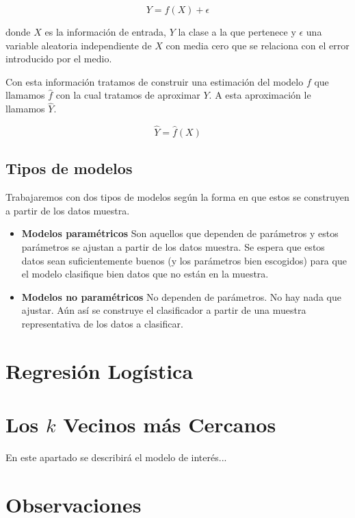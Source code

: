 \documentclass[11pt,letterpaper, reqno]{article}
\begin{document}
$$
Y = f(X) + \epsilon
$$

donde $X$ es la información de entrada, $Y$ la clase a la que pertenece y $\epsilon$  una variable aleatoria independiente de $X$ con media cero que se relaciona con el error introducido por el medio.

Con esta información tratamos de construir una estimación del modelo $f$ que llamamos $\hat{f}$ con la cual tratamos de aproximar $Y$. A esta aproximación le llamamos $\hat{Y}$.

$$
\hat{Y} = \hat{f}(X)
$$

\subsection{Tipos de modelos}

Trabajaremos con dos tipos de modelos según la forma en que estos se construyen a partir de los datos muestra.

\begin{itemize}
	\item \textbf{Modelos paramétricos} Son aquellos que dependen de parámetros y estos parámetros se ajustan a partir de los datos muestra. Se espera que estos datos sean suficientemente buenos (y los parámetros bien escogidos) para que el modelo clasifique bien datos que no están en la muestra.
	\item \textbf{Modelos no paramétricos} No dependen de parámetros. No hay nada que ajustar. Aún así se construye el clasificador a partir de una muestra representativa de los datos a clasificar.
\end{itemize}

\section{Regresión Logística}



\section{Los $k$ Vecinos más Cercanos}
En este apartado se describirá el modelo de interés...

\section{Observaciones}
\end{document}
